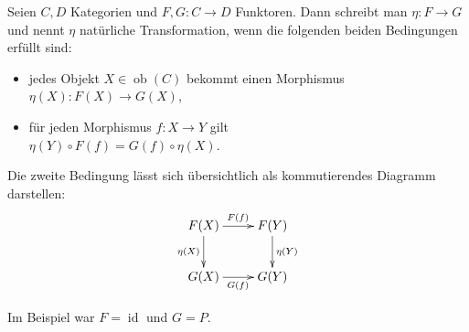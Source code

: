 \documentclass{beamer}
\newcommand{\id}{\operatorname{id}}
\newcommand{\ob}{\operatorname{ob}}
\begin{document}
\begin{frame}
Seien $C,D$ Kategorien und $F,G\colon C\to D$ Funktoren. Dann schreibt
man $\eta\colon F\to G$ und nennt $\eta$ natürliche Transformation,
wenn die folgenden beiden Bedingungen erfüllt sind:
\begin{itemize}
\item jedes Objekt $X\in\ob(C)$ bekommt einen Morphismus\\
  $\eta(X)\colon F(X)\to G(X)$,
\item für jeden Morphismus $f\colon X\to Y$ gilt\\
  $\eta(Y)\circ F(f) = G(f)\circ\eta(X)$.
\end{itemize}
\end{frame}

\begin{frame}
Die zweite Bedingung lässt sich übersichtlich als kommutierendes
Diagramm darstellen:
\[\xymatrix{
F(X) \ar[r]^{F(f)} \ar[d]_{\eta(X)} & F(Y) \ar[d]^{\eta(Y)} \\
G(X) \ar[r]_{G(f)} & G(Y)}\]
\end{frame}

\begin{frame}
Im Beispiel war $F=\id$ und $G=P$.
\end{frame}
\end{document}

